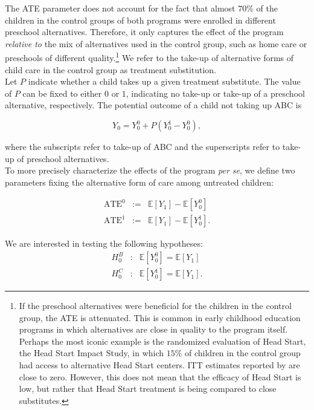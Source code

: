 \noindent The ATE parameter does not account for the fact that almost $70 \%$ of the children in the control groups of both programs were enrolled in different preschool alternatives. Therefore, it only captures the effect of the program \emph{relative to} the mix of alternatives used in the control group, such as home care or preschools of different quality.\footnote{If the preschool alternatives were beneficial for the children in the control group, the ATE is attenuated. This is common in early childhood education programs in which alternatives are close in quality to the program itself. Perhaps the most iconic example is the randomized evaluation of Head Start, the Head Start Impact Study, in which $15\%$ of children in the control group had access to alternative Head Start centers. ITT estimates reported by \cite{Puma_Bell_etal_2010_HeadStartImpact} are close to zero. However, this does not mean that the efficacy of Head Start is low, but rather that Head Start treatment is being compared to close substitutes.} We refer to the take-up of alternative forms of child care in the control group as treatment substitution.\\

\noindent Let $P$ indicate whether a child takes up a given treatment substitute. The value of $P$ can be fixed to either $0$ or $1$, indicating no take-up or take-up of a preschool alternative, respectively. The potential outcome of a child not taking up ABC is

\begin{equation}
Y_{0} = Y_{0}^0 + P \left( Y_{0}^1 - Y_{0}^0\right), \label{eq:y0}
\end{equation}

\noindent where the subscripts refer to take-up of ABC and the superscripts refer to take-up of preschool alternatives.\\ 

\noindent To more precisely characterize the effects of the program \emph{per se}, we define two parameters fixing the alternative form of care among untreated children: 

\begin{eqnarray}
\text{ATE}^0 &:=& \mathbb{E} \left[ Y_{1} \right] -  \mathbb{E} \left[ Y_{0}^0 \right] \\
\text{ATE}^1 &:=& \mathbb{E} \left[ Y_{1} \right] -  \mathbb{E} \left[ Y_{0}^1 \right].
\end{eqnarray}

\noindent We are interested in testing the following hypotheses:
\begin{eqnarray}
H_{0}^B &:& \mathbb{E} \left[ Y_{0}^0 \right] =  \mathbb{E} \left[ Y_{1} \right] \label{eq:hoB} \\
H_{0}^C &:&  \mathbb{E} \left[ Y_{0}^1 \right] =  \mathbb{E} \left[ Y_{1}   \right] \label{eq:hoC}.
\end{eqnarray}

